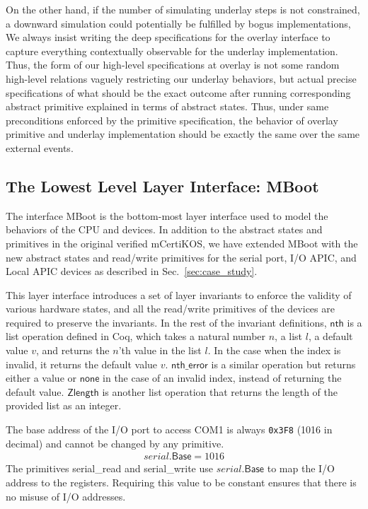 On the other hand, if the number of simulating underlay steps is not constrained, a
downward simulation could potentially be fulfilled by bogus implementations,  
We always insist writing the deep specifications for the overlay interface to
capture everything contextually observable for the underlay implementation.
Thus, the form of our high-level specifications at overlay is not some random
high-level relations vaguely restricting our underlay behaviors, but actual
precise specifications of what should be the exact outcome after running
corresponding abstract primitive explained in terms of abstract states.
Thus, under same preconditions enforced by the primitive specification, the
behavior of overlay primitive and underlay implementation should be exactly
the same over the same external events. 

\subsection{The Lowest Level Layer Interface: MBoot}

The interface MBoot is the bottom-most layer interface used to model the
behaviors of the CPU and devices. In addition to the abstract states and
primitives in the original verified mCertiKOS, we have extended MBoot with the
new abstract states and read/write primitives for the serial port, I/O APIC, and
Local APIC devices as described in Sec.~\ref{sec:case_study}.

This layer interface introduces a set of layer invariants to enforce the
validity of various hardware states, and all the read/write primitives of the
devices are required to preserve the invariants. In the rest of the invariant
definitions, $\textsf{nth}$ is a list operation defined in Coq, which takes a
natural number $n$, a list $l$, a default value $v$, and returns the $n$'th
value in the list $l$. In the case when the index is invalid, it returns the
default value $v$. $\textsf{nth\_error}$ is a similar operation but returns
either a value or $\textsf{none}$ in the case of an invalid index, instead of
returning the default value. $\textsf{Zlength}$ is another list operation that
returns the length of the provided list as an integer.

\begin{invariant}
The base address of the I/O port to access \textsf{COM1} is always
\texttt{0x3F8} (1016 in decimal) and cannot be changed by any primitive.
\begin{align*}
serial.\textsf{Base} = 1016
\end{align*}
\noindent{}\textnormal{The primitives \textsf{serial\_read} and
	\textsf{serial\_write} use $serial.\textsf{Base}$ to map the I/O address to the
	registers. Requiring this value to be constant ensures that there is no misuse
	of I/O addresses.}
\end{invariant}

